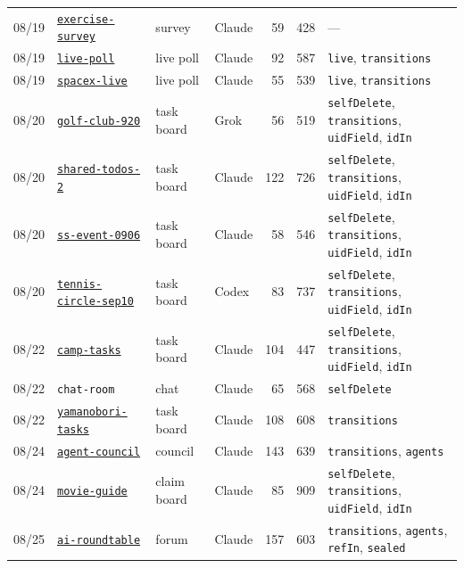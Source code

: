 \begin{table}[p]
\begin{tabular}{@{}llllrr>{\raggedright\arraybackslash}p{4.6cm}@{}}
08/19 & \href{https://mulmoserver.web.app/a/exercise-survey}{\texttt{exercise-survey}} & survey & Claude & 59 & 428 & --- \\
08/19 & \href{https://mulmoserver.web.app/a/live-poll}{\texttt{live-poll}} & live poll & Claude & 92 & 587 & \texttt{live}, \texttt{transitions} \\
08/19 & \href{https://mulmoserver.web.app/a/spacex-live}{\texttt{spacex-live}} & live poll & Claude & 55 & 539 & \texttt{live}, \texttt{transitions} \\
08/20 & \href{https://mulmoserver.web.app/a/golf-club-920}{\texttt{golf-club-920}} & task board & Grok & 56 & 519 & \texttt{selfDelete}, \texttt{transitions}, \texttt{uidField}, \texttt{idIn} \\
08/20 & \href{https://mulmoserver.web.app/a/shared-todos-2}{\texttt{shared-todos-2}} & task board & Claude & 122 & 726 & \texttt{selfDelete}, \texttt{transitions}, \texttt{uidField}, \texttt{idIn} \\
08/20 & \href{https://mulmoserver.web.app/a/ss-event-0906}{\texttt{ss-event-0906}} & task board & Claude & 58 & 546 & \texttt{selfDelete}, \texttt{transitions}, \texttt{uidField}, \texttt{idIn} \\
08/20 & \href{https://mulmoserver.web.app/a/tennis-circle-sep10}{\texttt{tennis-circle-sep10}} & task board & Codex & 83 & 737 & \texttt{selfDelete}, \texttt{transitions}, \texttt{uidField}, \texttt{idIn} \\
08/22 & \href{https://mulmoserver.web.app/a/camp-tasks}{\texttt{camp-tasks}} & task board & Claude & 104 & 447 & \texttt{selfDelete}, \texttt{transitions}, \texttt{uidField}, \texttt{idIn} \\
08/22 & \texttt{chat-room} & chat & Claude & 65 & 568 & \texttt{selfDelete} \\
08/22 & \href{https://mulmoserver.web.app/a/yamanobori-tasks}{\texttt{yamanobori-tasks}} & task board & Claude & 108 & 608 & \texttt{transitions} \\
08/24 & \href{https://mulmoserver.web.app/a/agent-council}{\texttt{agent-council}} & council & Claude & 143 & 639 & \texttt{transitions}, \texttt{agents} \\
08/24 & \href{https://mulmoserver.web.app/a/movie-guide}{\texttt{movie-guide}} & claim board & Claude & 85 & 909 & \texttt{selfDelete}, \texttt{transitions}, \texttt{uidField}, \texttt{idIn} \\
08/25 & \href{https://mulmoserver.web.app/a/ai-roundtable}{\texttt{ai-roundtable}} & forum & Claude & 157 & 603 & \texttt{transitions}, \texttt{agents}, \texttt{refIn}, \texttt{sealed} \\

\end{tabular}
\end{table}
